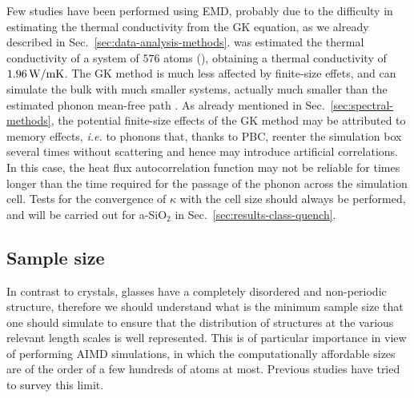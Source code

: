 Few studies have been performed using EMD, probably due to the difficulty in estimating the thermal conductivity from the GK equation, as we already described in Sec.~\ref{sec:data-analysis-methods}.
\citet{McGaughey2004b} was estimated the thermal conductivity of a system of $576$ atoms (), obtaining a thermal conductivity of $1.96\,\mathrm{W/mK}$. 
The GK method is much less affected by finite-size effets, and can simulate the bulk with much smaller systems, actually much smaller than the estimated phonon mean-free path \cite{Schelling2002}. As already mentioned in Sec.~\ref{sec:spectral-methods}, the potential finite-size effects of the GK method may be attributed to memory effects, \emph{i.e.} to phonons that, thanks to PBC, reenter the simulation box several times without scattering and hence may introduce artificial correlations. In this case, the heat flux autocorrelation function may not be reliable for times longer than the time required for the passage of the phonon across the simulation cell. 
Tests for the convergence of $\kappa$ with the cell size should always be performed, and will be carried out for a-SiO$_2$ in Sec.~\ref{sec:results-class-quench}.




\subsection{Sample size}  \label{sec:silica-size}
In contrast to crystals, glasses have a completely disordered and non-periodic structure, therefore we should understand what is the minimum sample size that one should simulate to ensure that the distribution of structures at the various relevant length scales is well represented. This is of particular importance in view of performing AIMD simulations, in which the computationally affordable sizes are of the order of a few hundreds of atoms at most. Previous studies have tried to survey this limit. 

